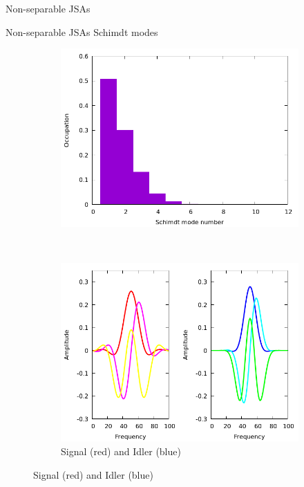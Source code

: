 \documentclass{beamer}
\begin{document}
\begin{frame}{Non-separable JSAs} 
    \begin{figure}
        \centering
        \end{figure}
    \end{frame}
%
    \begin{frame}{Non-separable JSAs Schimdt modes}
    \begin{figure}
        \centering
        \begin{subfigure}{0.4\textwidth}
            \includegraphics[width=1\textwidth]{notsepschmidtmodesocc.png}
        \end{subfigure}
        ~
        \begin{subfigure}{0.5\textwidth}
        \includegraphics[width=1\textwidth]{notsepsingle_sig_idler1.png}
        \caption{Signal (red) and Idler (blue)}
        \end{subfigure}


\end{figure}
\end{frame}
\end{document}
